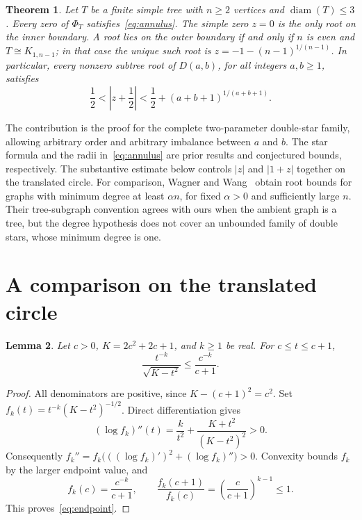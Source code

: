 \documentclass[11pt]{article}
\newtheorem{theorem}{Theorem}
\newtheorem{lemma}[theorem]{Lemma}
\DeclareMathOperator{\diam}{diam}
\newcommand{\abs}[1]{\left|#1\right|}
\begin{document}
\begin{theorem}\label{thm:main}
Let $T$ be a finite simple tree with $n\geq2$ vertices and
$\diam(T)\leq3$. Every zero of $\Phi_T$ satisfies~\eqref{eq:annulus}.
The simple zero $z=0$ is the only root on the inner boundary.
A root lies on the outer boundary if and only if $n$ is even and
$T\cong K_{1,n-1}$; in that case the unique such root is
$z=-1-(n-1)^{1/(n-1)}$.
In particular, every nonzero subtree root of $D(a,b)$, for all integers
$a,b\geq1$, satisfies
\begin{equation}\label{eq:strict}
 \frac12<\abs{z+\frac12}<\frac12+(a+b+1)^{1/(a+b+1)}.
\end{equation}
\end{theorem}

The contribution is the proof for the complete two-parameter double-star
family, allowing arbitrary order and arbitrary imbalance between $a$ and $b$.
The star formula and the radii in~\eqref{eq:annulus} are prior results
and conjectured bounds, respectively. The substantive estimate below
controls $|z|$ and $|1+z|$ together on the translated circle.
For comparison, Wagner and Wang~\cite[Theorem~3]{WagnerWang2026}
obtain root bounds for graphs with minimum degree at least $\alpha n$,
for fixed $\alpha>0$ and sufficiently large $n$.
Their tree-subgraph convention agrees with ours when the ambient graph
is a tree, but the degree hypothesis does not cover an unbounded family
of double stars, whose minimum degree is one.

\section{A comparison on the translated circle}

\begin{lemma}\label{lem:endpoint}
Let $c>0$, $K=2c^2+2c+1$, and $k\geq1$ be real. For $c\leq t\leq c+1$,
\begin{equation}\label{eq:endpoint}
 \frac{t^{-k}}{\sqrt{K-t^2}}\leq\frac{c^{-k}}{c+1}.
\end{equation}
\end{lemma}
\begin{proof}
All denominators are positive, since $K-(c+1)^2=c^2$.
Set $f_k(t)=t^{-k}(K-t^2)^{-1/2}$. Direct differentiation gives
\[
 (\log f_k)''(t)=\frac{k}{t^2}+\frac{K+t^2}{(K-t^2)^2}>0.
\]
Consequently $f_k''=f_k\bigl(((\log f_k)')^2+(\log f_k)''\bigr)>0$.
Convexity bounds $f_k$ by the larger endpoint value, and
\[
 f_k(c)=\frac{c^{-k}}{c+1},\qquad
 \frac{f_k(c+1)}{f_k(c)}=\left(\frac{c}{c+1}\right)^{k-1}\leq1.
\]
This proves~\eqref{eq:endpoint}.
\end{proof}
\end{document}

